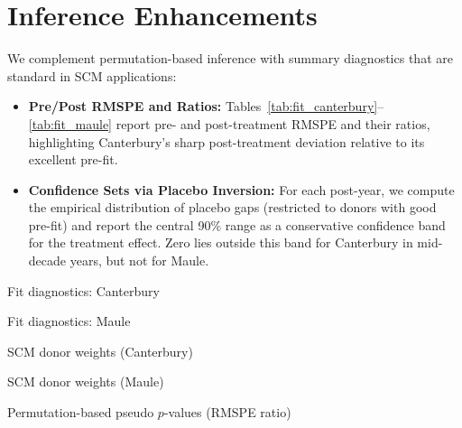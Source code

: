 \section{Inference Enhancements}\label{sec:inference}
We complement permutation-based inference with summary diagnostics that are standard in SCM applications:
\begin{itemize}
  \item \textbf{Pre/Post RMSPE and Ratios:} Tables~\ref{tab:fit_canterbury}--\ref{tab:fit_maule} report pre- and post-treatment RMSPE and their ratios, highlighting Canterbury's sharp post-treatment deviation relative to its excellent pre-fit.
  \item \textbf{Confidence Sets via Placebo Inversion:} For each post-year, we compute the empirical distribution of placebo gaps (restricted to donors with good pre-fit) and report the central 90\% range as a conservative confidence band for the treatment effect. Zero lies outside this band for Canterbury in mid-decade years, but not for Maule.
\end{itemize}

\begin{table}[H]
\centering
\caption{Fit diagnostics: Canterbury}
\label{tab:fit_canterbury}

\end{table}

\begin{table}[H]
\centering
\caption{Fit diagnostics: Maule}
\label{tab:fit_maule}

\end{table}

\begin{table}[H]
\centering
\caption{SCM donor weights (Canterbury)}
\label{tab:weights_canterbury}

\end{table}

\begin{table}[H]
\centering
\caption{SCM donor weights (Maule)}
\label{tab:weights_maule}

\end{table}


\begin{table}[H]
\centering
\caption{Permutation-based pseudo $p$-values (RMSPE ratio)}
\label{tab:pvalues}


\medskip

\end{table}
